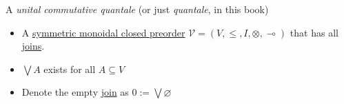 A \emph{unital commutative quantale} (or just \emph{quantale}, in this book)

\begin{itemize}
    \item  A \href{doc/1 math/Seven Sketches in Compositionality/Chapter 2: Resource theories/5 Computing presented V-categories with matrix mult/1 Monoidal closed preorders/1 Closed SMP}{symmetric monoidal closed preorder} $\mathcal{V}=(V,\leq,I,\otimes,\multimap)$ that has all \href{doc/1 math/Seven Sketches in Compositionality/Chapter 1: Generative Effects/5 Meets and joins/1 Definition and basic examples/Meet and join}{joins}.
    \item $\bigvee A$ exists for all $A \subseteq V$
    \item Denote the empty \href{doc/1 math/Seven Sketches in Compositionality/Chapter 1: Generative Effects/5 Meets and joins/1 Definition and basic examples/Meet and join}{join} as $0 := \bigvee \varnothing$
  \end{itemize}
